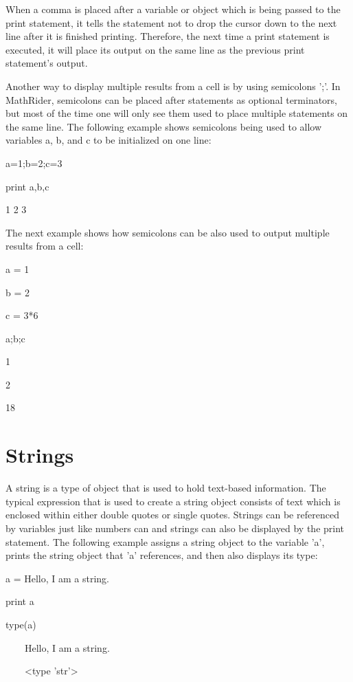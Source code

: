 \documentclass[12pt,oneside]{book}
\begin{document}
When a comma is placed after a variable or object which is being passed to the print statement, it tells the statement not to drop the cursor down to the next line after it is finished printing. Therefore, the next time a print statement is executed, it will place its output on the same line as the previous print statement's output.


Another way to display multiple results from a cell is by using semicolons ';'. In MathRider, semicolons can be placed after statements as optional terminators, but most of the time one will only see them used to place multiple statements on the same line. The following example shows semicolons being used to allow variables a, b, and c to be initialized on one line:


a=1;b=2;c=3

print a,b,c

{\textbar}

1 2 3

The next example shows how semicolons can be also used to output multiple results from a cell: 

a = 1

b = 2

c = 3*6

a;b;c

{\textbar}

1

2

18

\section[Strings]{Strings}
A string is a type of object that is used to hold text{}-based information. The typical expression that is used to create a string object consists of text which is enclosed within either double quotes or single quotes. Strings can be referenced by variables just like numbers can and strings can also be displayed by the print statement. The following example assigns a string object to the variable 'a', prints the string object that 'a' references, and then also displays its type: 

a = {\textquotedbl}Hello, I am a string.{\textquotedbl}

print a

type(a)

{\textbar}

\ \ \ \ Hello, I am a string.

\ \ \ \ {\textless}type
'str'{\textgreater}
\end{document}
